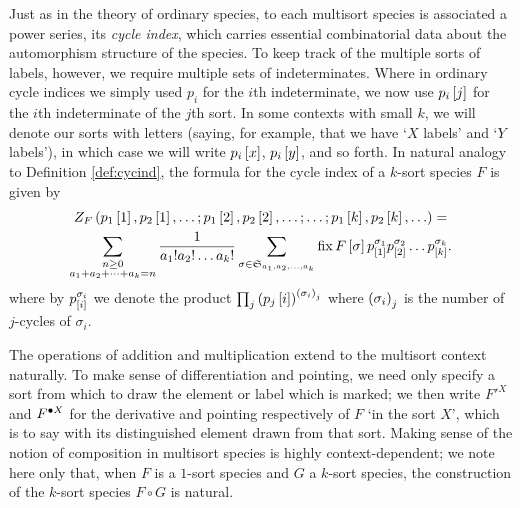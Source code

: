 \documentclass[sectionflow,singlespace,twoside,boldmathhdr]{brandiss} %
\numberwithin{section}{chapter}
\numberwithin{figure}{chapter}
\begin{document}
Just as in the theory of ordinary species, to each multisort species is associated a power series, its \emph{cycle index}, which carries essential combinatorial data about the automorphism structure of the species.
To keep track of the multiple sorts of labels, however, we require multiple sets of indeterminates.
Where in ordinary cycle indices we simply used $p_{i}$ for the $i$th indeterminate, we now use $p_{i} \sbrac{j}$ for the $i$th indeterminate of the $j$th sort.
In some contexts with small $k$, we will denote our sorts with letters (saying, for example, that we have `$X$ labels' and `$Y$ labels'), in which case we will write $p_{i} \sbrac{x}$, $p_{i} \sbrac{y}$, and so forth.
In natural analogy to Definition \ref{def:cycind}, the formula for the cycle index of a $k$-sort species $F$ is given by
\begin{multline}
  \label{eq:multcycinddef}
  Z_{F} \pbrac{p_{1} \sbrac{1}, p_{2} \sbrac{1}, \dots; p_{1} \sbrac{2}, p_{2} \sbrac{2}, \dots; \dots; p_{1} \sbrac{k}, p_{2} \sbrac{k}, \dots} = \\
  \sum_{\substack{n \geq 0 \\ a_{1} + a_{2} + \dots + a_{k} = n}} \frac{1}{a_{1}! a_{2}! \dots a_{k}!} \sum_{\sigma \in \mathfrak{S}_{a_{1}, a_{2}, \dots, a_{k}}} \fix F \sbrac{\sigma} p^{\sigma_{1}}_{\sbrac{1}} p^{\sigma_{2}}_{\sbrac{2}} \dots p^{\sigma_{k}}_{\sbrac{k}}.
\end{multline}
where by $p^{\sigma_{i}}_{\sbrac{i}}$ we denote the product $\prod_{j} \pbrac{p_{j} \sbrac{i}}^{\pbrac{\sigma_{i}}_{j}}$ where $\pbrac{\sigma_{i}}_{j}$ is the number of $j$-cycles of $\sigma_{i}$.

The operations of addition and multiplication extend to the multisort context naturally.
To make sense of differentiation and pointing, we need only specify a sort from which to draw the element or label which is marked; we then write $F'^{X}$ and $\pointed[X]{F}$ for the derivative and pointing respectively of $F$ `in the sort $X$', which is to say with its distinguished element drawn from that sort.
Making sense of the notion of composition in multisort species is highly context-dependent; we note here only that, when $F$ is a $1$-sort species and $G$ a $k$-sort species, the construction of the $k$-sort species $F \circ G$ is natural. 
\end{document}
